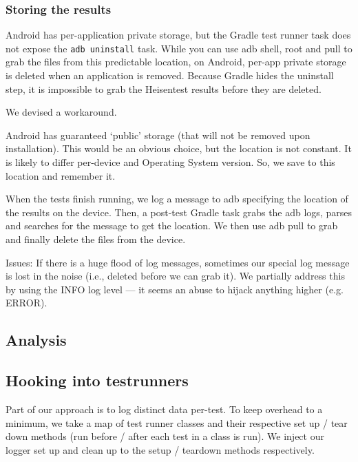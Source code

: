 \subsubsection{Storing the results}

Android has per-application private storage, but the Gradle test runner task does not expose the \texttt{adb uninstall} task. While you can use adb shell, root and pull to grab the files from this predictable location, on Android, per-app private storage is deleted when an application is removed. Because Gradle hides the uninstall step, it is impossible to grab the Heisentest results before they are deleted.

We devised a workaround.

Android has guaranteed {\lq}public{\rq} storage (that will not be removed upon installation). This would be an obvious choice, but the location is not constant. It is likely to differ per-device and Operating System version. So, we save to this location and remember it.

When the tests finish running, we log a message to adb specifying the location of the results on the device. Then, a post-test Gradle task grabs the adb logs, parses and searches for the message to get the location. We then use adb pull to grab and finally delete the files from the device.

Issues:
If there is a huge flood of log messages, sometimes our special log message is lost in the noise (i.e., deleted before we can grab it). We partially address this by using the INFO log level --- it seems an abuse to hijack anything higher (e.g. ERROR).

\subsection{Analysis}


\subsection{Hooking into testrunners}

Part of our approach is to log distinct data per-test. To keep overhead to a minimum, we take a map of test runner classes and their respective set up / tear down methods (run before / after each test in a class is run). We inject our logger set up and clean up to the setup / teardown methods respectively.

